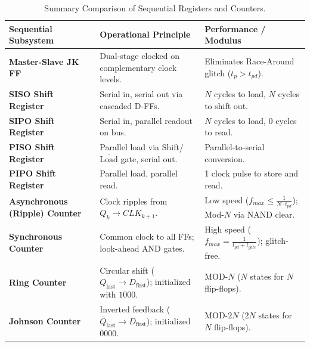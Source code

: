 \begin{table}[htbp]
\centering
\small
\begin{tabularx}{\textwidth}{lXX}
\toprule
\textbf{Sequential Subsystem} & \textbf{Operational Principle} & \textbf{Performance / Modulus} \\
\midrule
\textbf{Master-Slave JK FF} & Dual-stage clocked on complementary clock levels. & Eliminates Race-Around glitch ($t_p > t_{pd}$). \\
\textbf{SISO Shift Register} & Serial in, serial out via cascaded D-FFs. & $N$ cycles to load, $N$ cycles to shift out. \\
\textbf{SIPO Shift Register} & Serial in, parallel readout on bus. & $N$ cycles to load, 0 cycles to read. \\
\textbf{PISO Shift Register} & Parallel load via Shift/$\overline{\text{Load}}$ gate, serial out. & Parallel-to-serial conversion. \\
\textbf{PIPO Shift Register} & Parallel load, parallel read. & 1 clock pulse to store and read. \\
\textbf{Asynchronous (Ripple) Counter} & Clock ripples from $Q_k \rightarrow CLK_{k+1}$. & Low speed ($f_{max} \le \frac{1}{N \cdot t_{pd}}$); Mod-$N$ via NAND clear. \\
\textbf{Synchronous Counter} & Common clock to all FFs; look-ahead AND gates. & High speed ($f_{max} = \frac{1}{t_{pd} + t_{gate}}$); glitch-free. \\
\textbf{Ring Counter} & Circular shift ($Q_{\text{last}} \rightarrow D_{\text{first}}$); initialized with $1000$. & $\text{MOD-}N$ ($N$ states for $N$ flip-flops). \\
\textbf{Johnson Counter} & Inverted feedback ($\overline{Q}_{\text{last}} \rightarrow D_{\text{first}}$); initialized $0000$. & $\text{MOD-}2N$ ($2N$ states for $N$ flip-flops). \\
\bottomrule
\end{tabularx}
\caption{Summary Comparison of Sequential Registers and Counters.}
\label{tab:rev-registers-counters}
\end{table}
